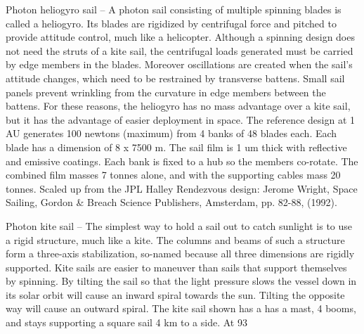 \documentclass[a4paper]{book}
\begin{document}
Photon heliogyro sail – A photon sail consisting of multiple spinning blades is called a heliogyro. Its blades are rigidized by centrifugal force and pitched to provide attitude control, much like a helicopter. Although a spinning design does not need the struts of a kite sail, the centrifugal loads generated must be carried by edge members in the blades. Moreover oscillations are created when the sail’s attitude changes, which need to be restrained by transverse battens. Small sail panels prevent wrinkling from the curvature in edge members between the battens. For these reasons, the heliogyro has no mass advantage over a kite sail, but it has the advantage of easier deployment in space. The reference design at 1 AU generates 100 newtons (maximum) from 4 banks of 48 blades each. Each blade has a dimension of 8 x 7500 m. The sail film is 1 um thick with reflective and emissive coatings. Each bank is fixed to a hub so the members co-rotate. The combined film masses 7 tonnes alone, and with the supporting cables mass 20 tonnes.
Scaled up from the JPL Halley Rendezvous design: Jerome Wright, Space Sailing, Gordon \& Breach Science Publishers, Amsterdam, pp. 82-88, (1992).
 
Photon kite sail – The simplest way to hold a sail out to catch sunlight is to use a rigid structure, much like a kite. The columns and beams of such a structure form a three-axis stabilization, so-named because all three dimensions are rigidly supported. Kite sails are easier to maneuver than sails that support themselves by spinning. By tilting the sail so that the light pressure slows the vessel down in its solar orbit will cause an inward spiral towards the sun.  Tilting the opposite way will cause an outward spiral.  The kite sail shown has a has a mast, 4 booms, and stays supporting a square sail 4 km to a side. At 93%
\end{document}
